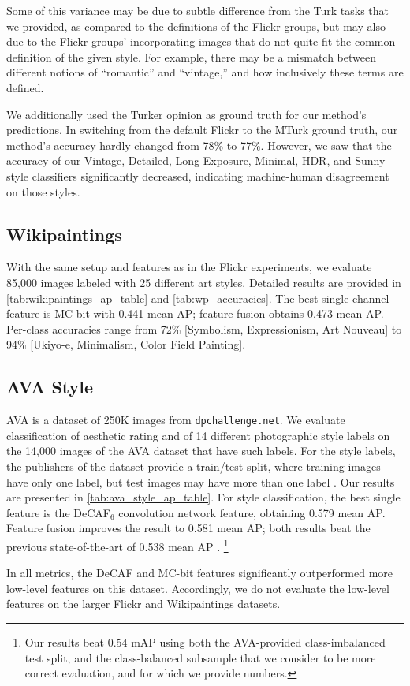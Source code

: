 Some of this variance may be due to subtle difference from the Turk tasks that we provided, as compared to the definitions of the Flickr groups, but may also due to the Flickr groups' incorporating images that do not quite fit the common definition of the given style.
For example, there may be a mismatch between different notions of ``romantic'' and ``vintage,'' and how inclusively these terms are defined.

We additionally used the Turker opinion as ground truth for our method's predictions.
In switching from the default Flickr to the MTurk ground truth, our method's accuracy hardly changed from 78\% to 77\%.
However, we saw that the accuracy of our Vintage, Detailed, Long Exposure, Minimal, HDR, and Sunny style classifiers significantly decreased, indicating machine-human disagreement on those styles.

\subsection{Wikipaintings}
With the same setup and features as in the Flickr experiments, we evaluate 85,000 images labeled with 25 different art styles.
Detailed results are provided in \autoref{tab:wikipaintings_ap_table} and \autoref{tab:wp_accuracies}.
The best single-channel feature is MC-bit with 0.441 mean AP; feature fusion obtains 0.473 mean AP.
Per-class accuracies range from 72\% [Symbolism, Expressionism, Art Nouveau] to 94\% [Ukiyo-e, Minimalism, Color Field Painting].


\subsection{AVA Style}
AVA \cite{Murray-CVPR-2012} is a dataset of 250K images from \texttt{dpchallenge.net}.
We evaluate classification of aesthetic rating and of 14 different photographic style labels on the 14,000 images of the AVA dataset that have such labels.
For the style labels, the publishers of the dataset provide a train/test split, where training images have only one label, but test images may have more than one label \cite{Murray-CVPR-2012}.
Our results are presented in \autoref{tab:ava_style_ap_table}.
For style classification, the best single feature is the DeCAF$_6$ convolution network feature, obtaining 0.579 mean AP.
Feature fusion improves the result to 0.581 mean AP; both results beat the previous state-of-the-art of 0.538 mean AP \cite{Murray-CVPR-2012}.
\footnote{Our results beat 0.54 mAP using both the AVA-provided class-imbalanced test split, and the class-balanced subsample that we consider to be more correct evaluation, and for which we provide numbers.}

In all metrics, the DeCAF and MC-bit features significantly outperformed more low-level features on this dataset.
Accordingly, we do not evaluate the low-level features on the larger Flickr and Wikipaintings datasets.
